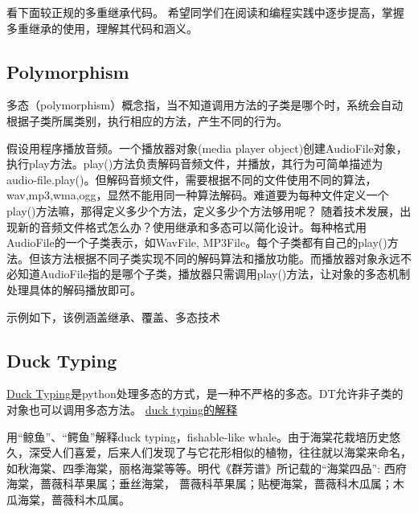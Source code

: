 看下面较正规的多重继承代码。
希望同学们在阅读和编程实践中逐步提高，掌握多重继承的使用，理解其代码和涵义。
\subsection{Polymorphism}
多态（polymorphism）概念指，当不知道调用方法的子类是哪个时，系统会自动根据子类所属类别，执行相应的方法，产生不同的行为。

假设用程序播放音频。一个播放器对象(media player object)创建AudioFile对象，执行play方法。play()方法负责解码音频文件，并播放，其行为可简单描述为audio-file.play()。但解码音频文件，需要根据不同的文件使用不同的算法，wav,mp3,wma,ogg，显然不能用同一种算法解码。难道要为每种文件定义一个play()方法嘛，那得定义多少个方法，定义多少个方法够用呢？ 随着技术发展，出现新的音频文件格式怎么办？使用继承和多态可以简化设计。每种格式用AudioFile的一个子类表示，如WavFile, MP3File。每个子类都有自己的play()方法。但该方法根据不同子类实现不同的解码算法和播放功能。而播放器对象永远不必知道AudioFile指的是哪个子类，播放器只需调用play()方法，让对象的多态机制处理具体的解码播放即可。

示例如下，该例涵盖继承、覆盖、多态技术

\subsection{Duck Typing}
\href{http://en.wikipedia.org/wiki/Duck_typing}{Duck Typing}是python处理多态的方式，是一种不严格的多态。DT允许非子类的对象也可以调用多态方法。
\href{http://www.voidspace.org.uk/python/articles/duck_typing.shtlm}{duck typing的解释}





用“鲸鱼”、“鳄鱼”解释duck typing，fishable-like whale。由于海棠花栽培历史悠久，深受人们喜爱，后来人们发现了与它花形相似的植物，往往就以海棠来命名，如秋海棠、四季海棠，丽格海棠等等。明代《群芳谱》所记载的“海棠四品”: 西府海棠，蔷薇科苹果属；垂丝海棠，
蔷薇科苹果属；贴梗海棠，蔷薇科木瓜属；木瓜海棠，蔷薇科木瓜属。

